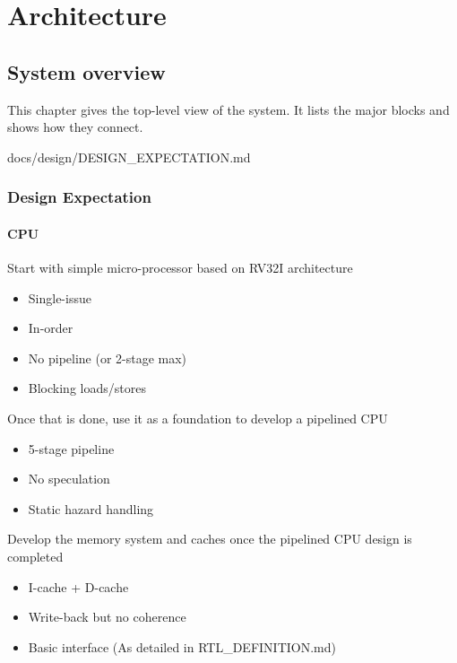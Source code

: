 \part{Architecture}\label{ds:part:architecture}

\chapter{System overview}\label{ds:ch:system-overview}

This chapter gives the top-level view of the system. It lists the major blocks and shows how they connect.

\begin{relocated}{docs/design/DESIGN_EXPECTATION.md}
\section{Design Expectation}\label{ds:ch:design-expectation}

\subsection{CPU}\label{ds:ch:design-expectation:cpu}

Start with simple micro-processor based on RV32I architecture

\begin{itemize}
\tightlist
\item
  Single-issue
\item
  In-order
\item
  No pipeline (or 2-stage max)
\item
  Blocking loads/\allowbreak{}stores
\end{itemize}

Once that is done, use it as a foundation to develop a pipelined CPU

\begin{itemize}
\tightlist
\item
  5-stage pipeline
\item
  No speculation
\item
  Static hazard handling
\end{itemize}

Develop the memory system and caches once the pipelined CPU design is
completed

\begin{itemize}
\tightlist
\item
  I-cache + D-cache
\item
  Write-back but no coherence
\item
  Basic interface (As detailed in RTL\_\allowbreak{}DEFINITION.md)
\end{itemize}


\end{relocated}

